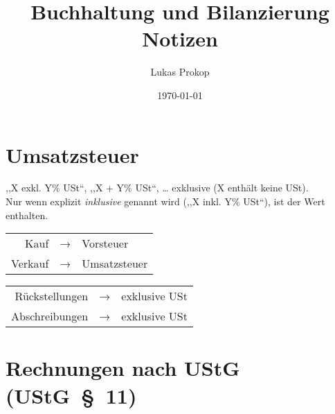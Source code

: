 \documentclass[11pt]{article}
\date{\today}
\author{Lukas Prokop}
\title{Buchhaltung und Bilanzierung Notizen}
\begin{document}
\maketitle

\section{Umsatzsteuer}
%
,,X exkl. Y\% USt``, ,,X + Y\% USt``, \dots{} exklusive (X enthält keine USt). \\
Nur wenn explizit \emph{inklusive} genannt wird (,,X inkl. Y\% USt``), ist der Wert enthalten.

\begin{table}[h]
  \begin{tabular}{rcl}
    Kauf & → & Vorsteuer \\
    Verkauf & → & Umsatzsteuer
  \end{tabular}
\end{table}

\begin{table}[h]
  \begin{tabular}{rcl}
    Rückstellungen & → & exklusive USt \\
    Abschreibungen & → & exklusive USt
  \end{tabular}
\end{table}
%
\section{Rechnungen nach UStG (UStG~§~11)}
\end{document}
